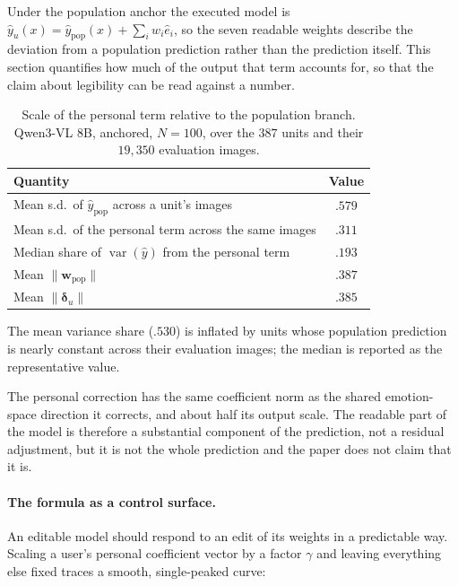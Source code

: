 Under the population anchor the executed model is
$\hat y_u(x)=\hat y_{\mathrm{pop}}(x)+\sum_i w_i \hat e_i$, so the seven
readable weights describe the deviation from a population prediction rather
than the prediction itself. This section quantifies how much of the output that
term accounts for, so that the claim about legibility can be read against a
number.

\begin{table}[t]
\centering
\begin{threeparttable}
\caption{Scale of the personal term relative to the population branch.
Qwen3-VL 8B, anchored, $N=100$, over the $387$ units and their $19{,}350$
evaluation images.}
\label{tab:personal_share}
\small
\setlength{\tabcolsep}{5pt}
\begin{tabular}{lc}
\toprule
Quantity & Value \\
\midrule
Mean s.d.\ of $\hat y_{\mathrm{pop}}$ across a unit's images & $.579$ \\
Mean s.d.\ of the personal term across the same images       & $.311$ \\
Median share of $\operatorname{var}(\hat y)$ from the personal term & $.193$ \\
Mean $\lVert\mathbf w_{\mathrm{pop}}\rVert$                  & $.387$ \\
Mean $\lVert\boldsymbol\delta_u\rVert$                       & $.385$ \\
\bottomrule
\end{tabular}
\begin{tablenotes}[flushleft]\footnotesize
\item The mean variance share ($.530$) is inflated by units whose population
prediction is nearly constant across their evaluation images; the median is
reported as the representative value.
\item The personal correction has the same coefficient norm as the shared
emotion-space direction it corrects, and about half its output scale. The
readable part of the model is therefore a substantial component of the
prediction, not a residual adjustment, but it is not the whole prediction and
the paper does not claim that it is.
\end{tablenotes}
\end{threeparttable}
\end{table}

\paragraph{The formula as a control surface.}
An editable model should respond to an edit of its weights in a predictable
way. Scaling a user's personal coefficient vector by a factor $\gamma$ and
leaving everything else fixed traces a smooth, single-peaked curve:

